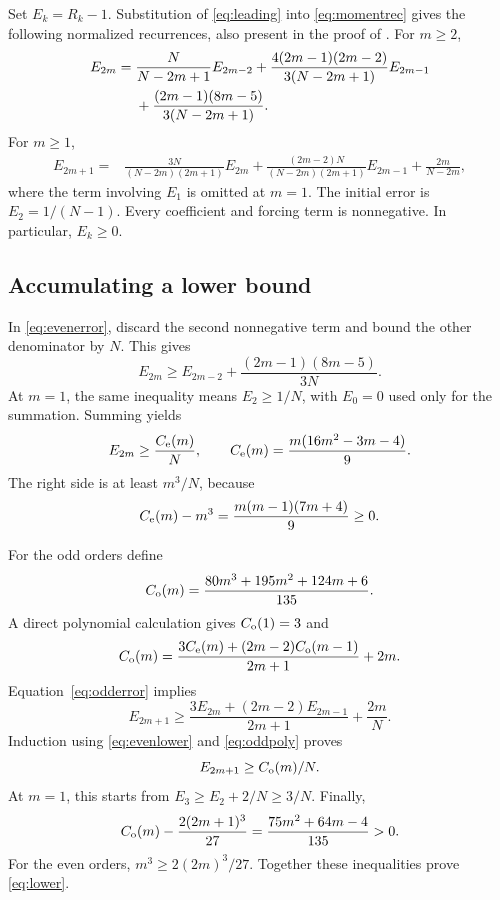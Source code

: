 Set $E_k=R_k-1$. Substitution of \eqref{eq:leading} into \eqref{eq:momentrec} gives the following normalized recurrences, also present in the proof of \cite[Proposition 3.3]{CN}. For $m\ge2$,
\begin{align}
E_{2m}={}&\frac{N}{N-2m+1}E_{2m-2}
+\frac{4(2m-1)(2m-2)}{3(N-2m+1)}E_{2m-1}\notag\\
&+\frac{(2m-1)(8m-5)}{3(N-2m+1)}.\label{eq:evenerror}
\end{align}
For $m\ge1$,
\begin{align}
E_{2m+1}={}&\frac{3N}{(N-2m)(2m+1)}E_{2m}
+\frac{(2m-2)N}{(N-2m)(2m+1)}E_{2m-1}
+\frac{2m}{N-2m},\label{eq:odderror}
\end{align}
where the term involving $E_1$ is omitted at $m=1$. The initial error is $E_2=1/(N-1)$. Every coefficient and forcing term is nonnegative. In particular, $E_k\ge0$.

\subsection{Accumulating a lower bound}

In \eqref{eq:evenerror}, discard the second nonnegative term and bound the other denominator by $N$. This gives
\[
E_{2m}\ge E_{2m-2}+\frac{(2m-1)(8m-5)}{3N}.
\]
At $m=1$, the same inequality means $E_2\ge1/N$, with $E_0=0$ used only for the summation. Summing yields
\begin{equation}\label{eq:evenlower}
E_{2m}\ge\frac{C_{\rm e}(m)}N,
\qquad C_{\rm e}(m)=\frac{m(16m^2-3m-4)}9.
\end{equation}
The right side is at least $m^3/N$, because
\[
C_{\rm e}(m)-m^3=\frac{m(m-1)(7m+4)}9\ge0.
\]

For the odd orders define
\[
C_{\rm o}(m)=\frac{80m^3+195m^2+124m+6}{135}.
\]
A direct polynomial calculation gives $C_{\rm o}(1)=3$ and
\begin{equation}\label{eq:oddpoly}
C_{\rm o}(m)=\frac{3C_{\rm e}(m)+(2m-2)C_{\rm o}(m-1)}{2m+1}+2m.
\end{equation}
Equation~\eqref{eq:odderror} implies
\[
E_{2m+1}\ge\frac{3E_{2m}+(2m-2)E_{2m-1}}{2m+1}+\frac{2m}N.
\]
Induction using \eqref{eq:evenlower} and \eqref{eq:oddpoly} proves
\begin{equation}\label{eq:oddlower}
E_{2m+1}\ge C_{\rm o}(m)/N.
\end{equation}
At $m=1$, this starts from $E_3\ge E_2+2/N\ge3/N$. Finally,
\[
C_{\rm o}(m)-\frac{2(2m+1)^3}{27}
=\frac{75m^2+64m-4}{135}>0.
\]
For the even orders, $m^3\ge2(2m)^3/27$. Together these inequalities prove \eqref{eq:lower}.

